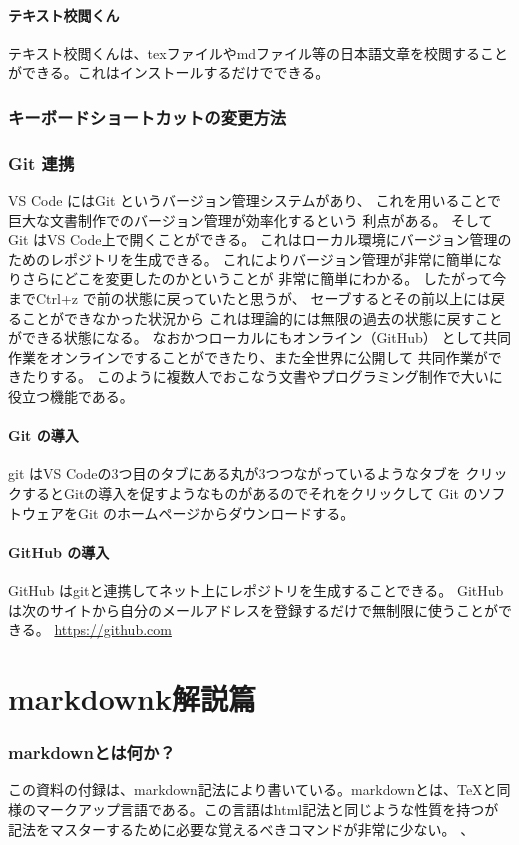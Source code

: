 \documentclass{ltjsarticle}
\begin{document}
\subsection{テキスト校閲くん}
テキスト校閲くんは、texファイルやmdファイル等の日本語文章を校閲することができる。これはインストールするだけでできる。

\section{キーボードショートカットの変更方法}

\section{Git 連携}
VS Code にはGit というバージョン管理システムがあり、
これを用いることで巨大な文書制作でのバージョン管理が効率化するという
利点がある。
そしてGit はVS Code上で開くことができる。
これはローカル環境にバージョン管理のためのレポジトリを生成できる。
これによりバージョン管理が非常に簡単になりさらにどこを変更したのかということが
非常に簡単にわかる。
したがって今までCtrl+z で前の状態に戻っていたと思うが、
セーブするとその前以上には戻ることができなかった状況から
これは理論的には無限の過去の状態に戻すことができる状態になる。
なおかつローカルにもオンライン（GitHub）
として共同作業をオンラインですることができたり、また全世界に公開して
共同作業ができたりする。
このように複数人でおこなう文書やプログラミング制作で大いに役立つ機能である。
\subsection{Git の導入}
git はVS Codeの3つ目のタブにある丸が3つつながっているようなタブを
クリックするとGitの導入を促すようなものがあるのでそれをクリックして
Git のソフトウェアをGit のホームページからダウンロードする。
\subsection{GitHub の導入}
GitHub はgitと連携してネット上にレポジトリを生成することできる。
GitHub は次のサイトから自分のメールアドレスを登録するだけで無制限に使うことができる。
\url{https://github.com}

\part{markdownk解説篇}
\section{markdownとは何か？}
この資料の付録は、markdown記法により書いている。markdownとは、TeXと同様のマークアップ言語である。この言語はhtml記法と同じような性質を持つが記法をマスターするために必要な覚えるべきコマンドが非常に少ない。
、
\end{document}
